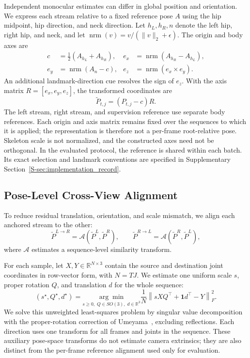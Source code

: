 \documentclass[preprint,12pt]{elsarticle}
\begin{document}
Independent monocular estimates can differ in global position and orientation. We express each stream relative to a fixed reference pose \(A\) using the hip midpoint, hip direction, and neck direction. Let \(h_L,h_R,n\) denote the left hip, right hip, and neck, and let \(\operatorname{nrm}(v)=v/(\|v\|_2+\epsilon)\). The origin and body axes are
\[
\begin{aligned}
c&=\tfrac12(A_{h_L}+A_{h_R}), &
e_x&=\operatorname{nrm}(A_{h_R}-A_{h_L}),\\
e_y&=\operatorname{nrm}(A_n-c), &
e_z&=\operatorname{nrm}(e_x\times e_y).
\end{aligned}
\]
An additional landmark-direction cue resolves the sign of \(e_z\). With the axis matrix \(R=[e_x,e_y,e_z]\), the transformed coordinates are
\[
\tilde{P}_{t,j}=(P_{t,j}-c)R.
\]
The left stream, right stream, and supervision reference use separate body references. Each origin and axis matrix remains fixed over the sequences to which it is applied; the representation is therefore not a per-frame root-relative pose. Skeleton scale is not normalized, and the constructed axes need not be orthogonal. In the evaluated protocol, the reference is shared within each batch. Its exact selection and landmark conventions are specified in Supplementary Section~\ref{S-sec:implementation_record}.

\subsection{Pose-Level Cross-View Alignment}
\label{subsec:pose_alignment}

To reduce residual translation, orientation, and scale mismatch, we align each anchored stream to the other:
\[
\tilde{P}^{L \rightarrow R} = \mathcal{A}(\tilde{P}^{L}, \tilde{P}^{R}),
\qquad
\tilde{P}^{R \rightarrow L} = \mathcal{A}(\tilde{P}^{R}, \tilde{P}^{L}),
\]
where \(\mathcal{A}\) estimates a sequence-level similarity transform.

For each sample, let \(X,Y\in\mathbb{R}^{N\times3}\) contain the source and destination joint coordinates in row-vector form, with \(N=TJ\). We estimate one uniform scale \(s\), proper rotation \(Q\), and translation \(d\) for the whole sequence:
\[
(s^\star,Q^\star,d^\star)=
\underset{s\geq0,\;Q\in SO(3),\;d\in\mathbb{R}^{3}}{\arg\min}
\frac{1}{N}\left\|sXQ^\top+\mathbf{1}d^\top-Y\right\|_F^2.
\]
We solve this unweighted least-squares problem by singular value decomposition with the proper-rotation correction of Umeyama~\cite{umeyama1991least}, excluding reflections. Each direction uses one transform for all frames and joints in the sequence. These auxiliary pose-space transforms do not estimate camera extrinsics; they are also distinct from the per-frame reference alignment used only for evaluation.
\end{document}
